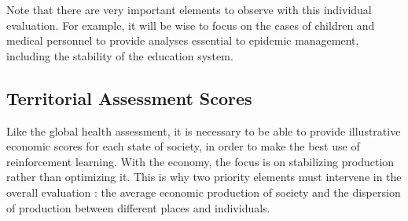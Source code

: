 Note that there are very important elements to observe with this individual evaluation. For example, it will be wise to focus on the cases of children and medical personnel to provide analyses essential to epidemic management, including the stability of the education system.\\

\subsection{Territorial Assessment Scores}

Like the global health assessment, it is necessary to be able to provide illustrative economic scores for each state of society, in order to make the best use of reinforcement learning. With the economy, the focus is on stabilizing production rather than optimizing it. This is why two priority elements must intervene in the overall evaluation : the average economic production of society and the dispersion of production between different places and individuals.